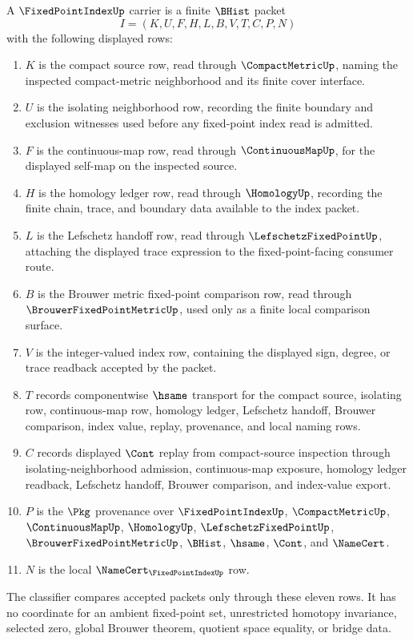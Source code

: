 \begin{definition}
\label{def:fixed-point-index-carrier}
A $\FixedPointIndexUp$ carrier is a finite $\BHist$ packet
$$
I=(K,U,F,H,L,B,V,T,C,P,N)
$$
with the following displayed rows:
\begin{enumerate}
\item $K$ is the compact source row, read through $\CompactMetricUp$, naming the inspected compact-metric neighborhood and its finite cover interface.
\item $U$ is the isolating neighborhood row, recording the finite boundary and exclusion witnesses used before any fixed-point index read is admitted.
\item $F$ is the continuous-map row, read through $\ContinuousMapUp$, for the displayed self-map on the inspected source.
\item $H$ is the homology ledger row, read through $\HomologyUp$, recording the finite chain, trace, and boundary data available to the index packet.
\item $L$ is the Lefschetz handoff row, read through $\LefschetzFixedPointUp$, attaching the displayed trace expression to the fixed-point-facing consumer route.
\item $B$ is the Brouwer metric fixed-point comparison row, read through $\BrouwerFixedPointMetricUp$, used only as a finite local comparison surface.
\item $V$ is the integer-valued index row, containing the displayed sign, degree, or trace readback accepted by the packet.
\item $T$ records componentwise $\hsame$ transport for the compact source, isolating row, continuous-map row, homology ledger, Lefschetz handoff, Brouwer comparison, index value, replay, provenance, and local naming rows.
\item $C$ records displayed $\Cont$ replay from compact-source inspection through isolating-neighborhood admission, continuous-map exposure, homology ledger readback, Lefschetz handoff, Brouwer comparison, and index-value export.
\item $P$ is the $\Pkg$ provenance over $\FixedPointIndexUp$, $\CompactMetricUp$, $\ContinuousMapUp$, $\HomologyUp$, $\LefschetzFixedPointUp$, $\BrouwerFixedPointMetricUp$, $\BHist$, $\hsame$, $\Cont$, and $\NameCert$.
\item $N$ is the local $\NameCert_{\FixedPointIndexUp}$ row.
\end{enumerate}
The classifier compares accepted packets only through these eleven rows. It has no coordinate for an ambient fixed-point set, unrestricted homotopy invariance, selected zero, global Brouwer theorem, quotient space equality, or bridge data.
\end{definition}

